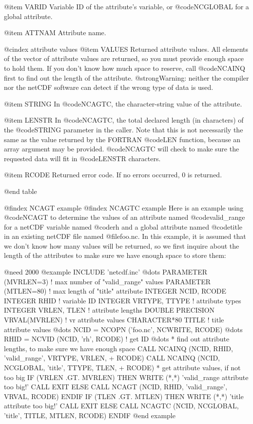 {@item VARID
Variable ID of the attribute's variable, or @code{NCGLOBAL} for a
global attribute.

@item ATTNAM
Attribute name.

@cindex attribute values
@item VALUES
Returned attribute values.  All elements of the vector of attribute
values are returned, so you must provide enough space to hold
them.  If you don't know how much space to reserve, call @code{NCAINQ}
first to find out the length of the attribute.  @strong{Warning:
neither the compiler nor the netCDF software can detect if the wrong
type of data is used.}

@item STRING
In @code{NCAGTC}, the character-string value of the attribute.

@item LENSTR
In @code{NCAGTC}, the total declared length (in characters) of the
@code{STRING} parameter in the caller.  Note that this is not
necessarily the same as the value returned by the FORTRAN @code{LEN}
function, because an array argument may be provided.  @code{NCAGTC} will
check to make sure the requested data will fit in @code{LENSTR}
characters.

@item RCODE
Returned error code.  If no errors occurred, 0 is returned.

@end table

@findex NCAGT example
@findex NCAGTC example
Here is an example using @code{NCAGT} to determine the values of an
attribute named @code{valid_range} for a netCDF variable named @code{rh}
and a global attribute named @code{title} in an existing netCDF file
named @file{foo.nc}.  In this example, it is assumed that we don't know
how many values will be returned, so we first inquire about the length
of the attributes to make sure we have enough space to store them:

@need 2000
@example
      INCLUDE 'netcdf.inc'
         @dots{}
      PARAMETER (MVRLEN=3) ! max number of "valid_range" values
      PARAMETER (MTLEN=80) ! max length of "title" attribute
      INTEGER  NCID, RCODE
      INTEGER  RHID               ! variable ID
      INTEGER  VRTYPE, TTYPE      ! attribute types
      INTEGER  VRLEN, TLEN        ! attribute lengths
      DOUBLE PRECISION VRVAL(MVRLEN) ! vr attribute values
      CHARACTER*80 TITLE          ! title attribute values
         @dots{}
      NCID = NCOPN ('foo.nc', NCWRITE, RCODE)
         @dots{}
      RHID = NCVID (NCID, 'rh', RCODE) ! get ID
         @dots{}
* find out attribute lengths, to make sure we have enough space
      CALL NCAINQ (NCID, RHID, 'valid_range', VRTYPE, VRLEN,
     +             RCODE)
      CALL NCAINQ (NCID, NCGLOBAL, 'title', TTYPE, TLEN,
     +             RCODE)
* get attribute values, if not too big
      IF (VRLEN .GT. MVRLEN) THEN
          WRITE (*,*) 'valid_range attribute too big!'
          CALL EXIT
      ELSE
          CALL NCAGT (NCID, RHID, 'valid_range', VRVAL, RCODE)
      ENDIF
      IF (TLEN .GT. MTLEN) THEN
          WRITE (*,*) 'title attribute too big!'
          CALL EXIT
      ELSE
          CALL NCAGTC (NCID, NCGLOBAL, 'title', TITLE, MTLEN, RCODE)
      ENDIF
@end example

}
